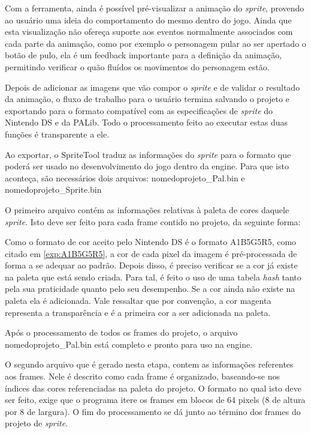 \documentclass[brazil]{abnt}
\begin{document}
Com a ferramenta, ainda é possível pré-visualizar a animação do \textit{sprite}, provendo ao usuário uma ideia do comportamento do mesmo dentro do jogo. Ainda que esta  visualização não ofereça suporte aos eventos normalmente associados com cada parte da animação, como por exemplo o personagem pular ao ser apertado o botão de pulo, ela é um feedback importante para a definição da animação, permitindo verificar o quão fluídos os movimentos do personagem estão.

Depois de adicionar as imagens que vão compor o \textit{sprite} e de validar o resultado da animação, o fluxo de trabalho para o usuário termina salvando o projeto e exportando para o formato compatível com as especificações de \textit{sprite} do Nintendo DS e da PALib. Todo o processamento feito ao executar estas duas funções é transparente a ele. 

Ao exportar, o SpriteTool traduz as informações do \textit{sprite} para o formato que poderá ser usado no desenvolvimento do jogo dentro da engine. Para que isto aconteça, são necessários dois arquivos: nomedoprojeto\_Pal.bin e nomedoprojeto\_Sprite.bin

O primeiro arquivo contém as informações relativas à paleta de cores daquele \textit{sprite}. Isto deve ser feito para cada frame contido no projeto, da seguinte forma:

Como o formato de cor aceito pelo Nintendo DS é o formato A1B5G5R5, como citado em \ref{exp:A1B5G5R5}, a cor de cada pixel da imagem é pré-processada de forma a se adequar ao padrão. Depois disso, é preciso verificar se a cor já existe na paleta que está sendo criada. Para tal, é feito o uso de uma tabela \textit{hash} tanto pela sua praticidade quanto pelo seu desempenho. Se a cor ainda não existe na paleta ela é adicionada. Vale ressaltar que por convenção, a cor magenta representa a transparência e é a primeira cor a ser adicionada na paleta. 

Após o processamento de todos os frames do projeto, o arquivo nomedoprojeto\_Pal.bin está completo e pronto para uso na engine.

O segundo arquivo que é gerado nesta etapa, contem as informações referentes aos frames. Nele é descrito como cada frame é organizado, baseando-se nos índices das cores referenciadas na paleta do projeto. O formato no qual isto deve ser feito, exige que o programa itere os frames em blocos de 64 pixels (8 de altura por 8 de largura). O fim do processamento se dá junto ao término dos frames do projeto de \textit{sprite}. 
\end{document}

